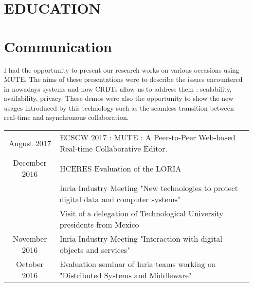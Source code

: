 \documentclass[]{deedy-resume-openfont}
\begin{document}
\section{EDUCATION}

\descript{}
\sectionsep


\section{Communication}

I had the opportunity to present our research works on various occasions using MUTE.
The aims of these presentations were to describe the issues encountered in nowadays systems
and how \acp{CRDT} allow us to address them : scalability, availability, privacy.
These demos were also the opportunity to show the new usages introduced by this technology
such as the seamless transition between real-time and asynchronous collaboration.

\vspace{5pt}
\begin{tabular}{cp{150mm}}
August 2017         & ECSCW 2017 : MUTE : A Peer-to-Peer Web-based Real-time Collaborative Editor.\\
December 2016       & HCERES Evaluation of the LORIA\\
                    & Inria Industry Meeting "New technologies to protect digital data and computer systems"\\
                    & Visit of a delegation of Technological University presidents from Mexico\\
November 2016       & Inria Industry Meeting "Interaction with digital objects and services"\\
October 2016        & Evaluation seminar of Inria teams working on "Distributed Systems and Middleware"\\
\end{tabular}

\hfill
\end{document}
